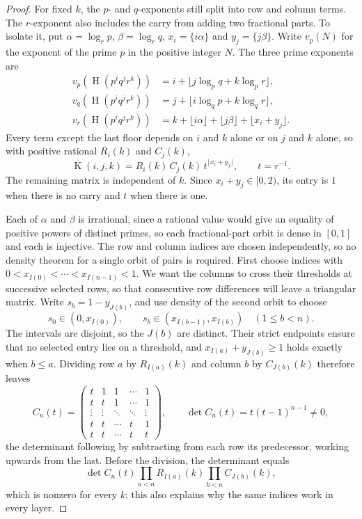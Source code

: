 \documentclass[11pt]{article}
\theoremstyle{remark}
\theoremstyle{plain}
\newcommand{\hgt}{\operatorname{H}}
\newcommand{\Kernel}{\operatorname{K}}
\begin{document}
\begin{proof}
For fixed $k$, the $p$- and $q$-exponents still split into row and column
terms. The $r$-exponent also includes the carry from adding two fractional
parts. To isolate it, put $\alpha=\log_r p$, $\beta=\log_r q$,
$x_i=\{i\alpha\}$ and $y_j=\{j\beta\}$. Write $v_p(N)$ for the exponent
of the prime $p$ in the positive integer $N$. The three prime exponents are
\[
 \begin{split}
 v_p(\hgt(p^iq^jr^k))&=i+\lfloor j\log_pq+k\log_pr\rfloor,\\
 v_q(\hgt(p^iq^jr^k))&=j+\lfloor i\log_qp+k\log_qr\rfloor,\\
 v_r(\hgt(p^iq^jr^k))&=k+\lfloor i\alpha\rfloor+\lfloor j\beta\rfloor+
   \lfloor x_i+y_j\rfloor .
 \end{split}
\]
Every term except the last floor depends on $i$ and $k$ alone or on $j$ and $k$
alone, so with positive rational $R_i(k)$ and $C_j(k)$,
\begin{equation}\label{long269:eq:carry-factorisation}
 \Kernel(i,j,k)=R_i(k)\,C_j(k)\,t^{\lfloor x_i+y_j\rfloor},
 \qquad t=r^{-1} .
\end{equation}
The remaining matrix is independent of $k$. Since $x_i+y_j\in[0,2)$,
its entry is $1$ when there is no carry and $t$ when there is one.

Each of $\alpha$ and $\beta$ is irrational, since a rational value would give
an equality of positive powers of distinct primes, so each fractional-part
orbit is dense in $[0,1]$ and each is injective.  The row and column indices
are chosen independently, so no density theorem for a single orbit of
pairs is required.  First choose indices with
$0<x_{I(0)}<\cdots<x_{I(n-1)}<1$.  We want the columns to cross their
thresholds at successive selected rows, so that consecutive row differences
will leave a triangular matrix.  Write $s_b=1-y_{J(b)}$, and use density
of the second orbit to choose
\[
 s_0\in(0,x_{I(0)}),\qquad
 s_b\in(x_{I(b-1)},x_{I(b)})\quad(1\le b<n).
\]
The intervals are disjoint, so the $J(b)$ are distinct.  Their strict
endpoints ensure that no selected entry lies on a threshold, and
$x_{I(a)}+y_{J(b)}\ge1$ holds exactly when $b\le a$.  Dividing row $a$ by
$R_{I(a)}(k)$ and column $b$ by $C_{J(b)}(k)$ therefore leaves
\[
 C_n(t)=\begin{pmatrix}
 t&1&1&\cdots&1\\
 t&t&1&\cdots&1\\
 \vdots&\vdots&\ddots&\ddots&\vdots\\
 t&t&\cdots&t&1\\
 t&t&\cdots&t&t
 \end{pmatrix},
 \qquad
 \det C_n(t)=t(t-1)^{n-1}\ne0 ,
\]
the determinant following by subtracting from each row its predecessor, working
upwards from the last.  Before the division, the determinant equals
\[
 \det C_n(t)\prod_{a<n}R_{I(a)}(k)\prod_{b<n}C_{J(b)}(k),
\]
which is nonzero for every $k$; this also explains why the same indices work
in every layer.


\end{proof}
\end{document}
